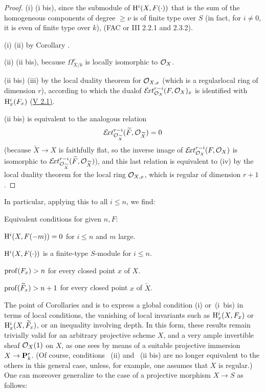 \begin{proof}
(i) \SSI (i bis), since the submodule of $\mathrm H^i(X, F(\cdot))$ that is the sum of the homogeneous components of degree $\geq \nu$ is of finite type over $S$ (in fact, for $i\neq 0$, it is even of finite type over $k$), (\cf FAC or \EGA III 2.2.1 and 2.3.2).

(i) \SSI (ii) by Corollary .

(ii) \SSI (ii bis), because $\Omega_{X/k}^r$ is locally isomorphic to $\mathcal O_X$.

(ii bis) \SSI (iii) by the local duality theorem for $\mathcal O_{X,x}$ (which is a regular\pageoriginale local ring of dimension $r$), according to which the \og dual\fg of $\mathcal E\!xt^{r-i}_{\mathcal O_X}(F, \mathcal O_X)_x$ is identified with $\mathrm H^i_x(F_x)$ (\hyperref[V.2.1]{V 2.1)}.

(ii bis) is equivalent to the analogous relation
\[
\mathcal E\!xt^{r-i}_{\mathcal O_{\widetilde{X}}}(\widetilde{F}, \mathcal O_{\widetilde{X}})=0
\]
(because $\widetilde{X}\to X$ is faithfully flat, so the inverse image of $\mathcal E\!xt^{r-i}_{\mathcal O_X}(F, \mathcal O_X)$ is isomorphic to $\mathcal E\!xt^{r-i}_{\mathcal O_{\widetilde{X}}}(\widetilde{F}, \mathcal O_{\widetilde{X}})$), and this last relation is equivalent to (iv) by the local duality theorem for the local ring $\mathcal O_{X,x}$, which is regular of dimension $r+1$.
\skipqed
\end{proof}

In particular, applying this to all $i\leq n$, we find:

\begin{corollaire} \label{XII.1.4}
Equivalent conditions for given $n,F$:
\begin{enumeratei}
\item
$\mathrm H^i(X, F(-m))=0$ for $i\leq n$ and $m$ large.
\item[\textup{(i bis)}] $\mathrm H^i(X, F(\cdot))$ is a finite-type $S$-module for $i\leq n$.
\item
$\operatorname{prof}(F_x)>n$ for every closed point $x$ of $X$.
\item
$\operatorname{prof}(\widetilde{F}_x)>n+1$ for every closed point $x$ of $\widetilde{X}$.
\end{enumeratei}
\end{corollaire}

The point of Corollaries  and  is to express a global condition (i) or~(i~bis) in terms of local conditions,  the vanishing of local invariants such as $\mathrm H_x^i(X, F_x)$ or $\mathrm H_x^i(X, \widetilde{F}_x)$, or an inequality involving depth. In this form, these results remain trivially valid for an arbitrary projective scheme $X$, and a very ample invertible sheaf $\mathcal O_X(1)$ on $X$, as one sees by means of a suitable projective immersion $X\to\mathbf P_k^r$. (Of course, conditions ~(ii) and ~(ii bis) are no longer equivalent to the others in this general case, unless, for example, one assumes that $X$ is regular.) One can moreover generalize to the case of a projective morphism $X\to S$ as follows:

